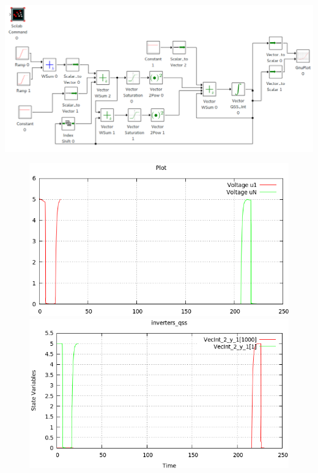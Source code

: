 \includegraphics[width=0.75\linewidth]{inverters}

\begin{figure}[H]
\centering
\begin{minipage}{0.5\textwidth}
\centering
 \includegraphics[width=\linewidth]{inversers-pd}
\end{minipage}\hfill
\begin{minipage}{0.5\textwidth}
\centering
 \includegraphics[width=\linewidth]{inversers-qss}
\end{minipage}
\end{figure}

